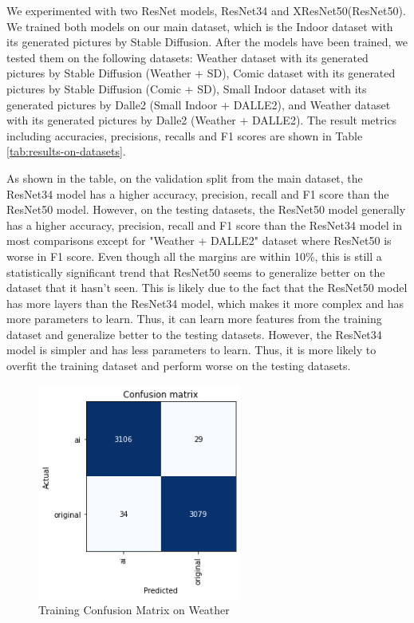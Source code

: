\documentclass[11pt]{article}
\begin{document}
We experimented with two ResNet models, ResNet34 and XResNet50(ResNet50). We trained both models on our main dataset, which is the Indoor dataset with its generated pictures by Stable Diffusion.  After the models have been trained, we tested them on the following datasets: Weather dataset with its generated pictures by Stable Diffusion (Weather + SD), Comic dataset with its generated pictures by Stable Diffusion (Comic + SD), Small Indoor dataset with its generated pictures by Dalle2 (Small Indoor + DALLE2), and Weather dataset with its generated pictures by Dalle2 (Weather + DALLE2). The result metrics including accuracies, precisions, recalls and F1 scores are shown in Table \ref{tab:results-on-datasets}.

As shown in the table, on the validation split from the main dataset, the ResNet34 model has a higher accuracy, precision, recall and F1 score than the ResNet50 model. However, on the testing datasets, the ResNet50 model generally has a higher accuracy, precision, recall and F1 score than the ResNet34 model in most comparisons except for "Weather + DALLE2" dataset where ResNet50 is worse in F1 score. Even though all the margins are within 10\%, this is still a statistically significant trend that ResNet50 seems to generalize better on the dataset that it hasn't seen. This is likely due to the fact that the ResNet50 model has more layers than the ResNet34 model, which makes it more complex and has more parameters to learn. Thus, it can learn more features from the training dataset and generalize better to the testing datasets. However, the ResNet34 model is simpler and has less parameters to learn. Thus, it is more likely to overfit the training dataset and perform worse on the testing datasets.

\begin{figure}[ht]
  \includegraphics[width=190pt]{./assets/paper_training_confusion_matrix.png}
  \caption{Training Confusion Matrix on Weather}
  \label{fig:paper_training_confusion_matrix}
\end{figure}
\end{document}
